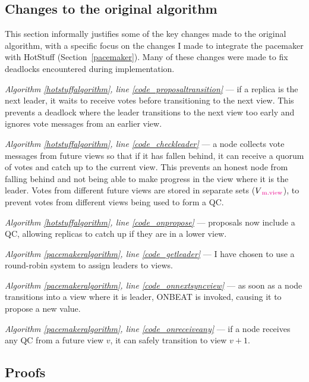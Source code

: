 \subsection{Changes to the original algorithm}
This section informally justifies some of the key changes made to the original algorithm, with a specific focus on the changes I made to integrate the pacemaker with HotStuff (Section~\ref{pacemaker}). Many of these changes were made to fix deadlocks encountered during implementation.

\begin{description}
	\item \textit{Algorithm \ref{hotstuffalgorithm}, line \ref{code_proposaltransition}} --- if a replica is the next leader, it waits to receive votes before transitioning to the next view. This prevents a deadlock where the leader transitions to the next view too early and ignores vote messages from an earlier view.
	\item \textit{Algorithm \ref{hotstuffalgorithm}, line \ref{code_checkleader}} --- a node collects vote messages from future views so that if it has fallen behind, it can receive a quorum of votes and catch up to the current view. This prevents an honest node from falling behind and not being able to make progress in the view where it is the leader. Votes from different future views are stored in separate sets ($V\textcolor{Magenta}{\textsubscript{m.view}}$), to prevent votes from different views being used to form a QC.
	\item \textit{Algorithm \ref{hotstuffalgorithm}, line \ref{code_onpropose}} --- proposals now include a QC, allowing replicas to catch up if they are in a lower view.
	\item \textit{Algorithm \ref{pacemakeralgorithm}, line \ref{code_getleader}} --- I have chosen to use a round-robin system to assign leaders to views.
	\item \textit{Algorithm \ref{pacemakeralgorithm}, line \ref{code_onnextsyncview}} --- as soon as a node transitions into a view where it is leader, ON{\large B}EAT is invoked, causing it to propose a new value.
	\item \textit{Algorithm \ref{pacemakeralgorithm}, line \ref{code_onreceiveany}} --- if a node receives any QC from a future view $v$, it can safely transition to view $v + 1$.
\end{description}

\subsection{Proofs} \label{proof}

